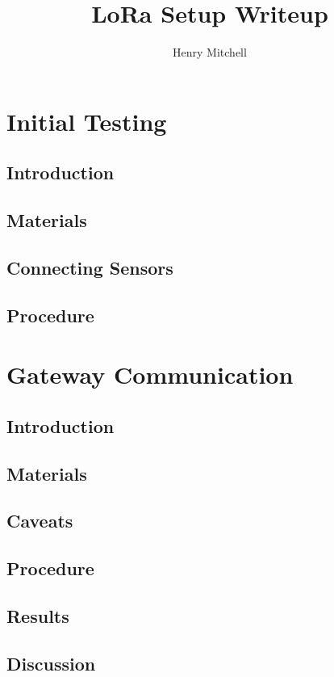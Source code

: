\documentclass[11pt,onecolumn]{IEEEtran}
\author{Henry Mitchell}
\title{LoRa Setup Writeup}
\date{}
\begin{document}
\maketitle
\section{Initial Testing}
\subsection{Introduction}
\label{sec:intro}


\subsection{Materials}
\label{sec:materials}


\subsection{Connecting Sensors}
\label{sec:setup}


\subsection{Procedure}
\label{sec:procedure}


\section{Gateway Communication}
\label{sec:gateway}
\subsection{Introduction}
\label{sec:gateway:intro}


\subsection{Materials}
\label{sec:gateway:materials}


\subsection{Caveats}
\label{sec:gateway:caveats}


\subsection{Procedure}
\label{sec:gateway:procedure}


\subsection{Results}
\label{sec:gateway:results}


\subsection{Discussion}
\label{sec:gateway:discussion}

\end{document}
